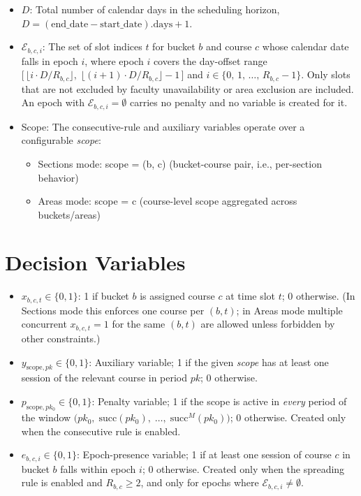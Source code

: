 \documentclass{article}
\begin{document}
\begin{itemize}
    \item $D$: Total number of calendar days in the scheduling horizon, $D = (\text{end\_date} - \text{start\_date}).\text{days} + 1$.
    \item $\mathcal{E}_{b,c,i}$: The set of slot indices $t$ for bucket $b$ and course $c$ whose calendar date falls in epoch $i$, where epoch $i$ covers the day-offset range $\bigl[\,\lfloor i \cdot D / R_{b,c} \rfloor,\; \lfloor (i+1) \cdot D / R_{b,c} \rfloor - 1\,\bigr]$ and $i \in \{0,\, 1,\, \ldots,\, R_{b,c} - 1\}$. Only slots that are not excluded by faculty unavailability or area exclusion are included. An epoch with $\mathcal{E}_{b,c,i} = \emptyset$ carries no penalty and no variable is created for it.
    \item Scope: The consecutive-rule and auxiliary variables operate over a configurable \emph{scope}:
    \begin{itemize}
        \item Sections mode: scope = (b, c) (bucket-course pair, i.e., per-section behavior)
        \item Areas mode: scope = c (course-level scope aggregated across buckets/areas)
    \end{itemize}
\end{itemize}

\section{Decision Variables}
\begin{itemize}
    \item $x_{b,c,t} \in \{0,1\}$: 1 if bucket $b$ is assigned course $c$ at time slot $t$; 0 otherwise. (In Sections mode this enforces one course per $(b,t)$; in Areas mode multiple concurrent $x_{b,c,t}=1$ for the same $(b,t)$ are allowed unless forbidden by other constraints.)
    \item $y_{\mathrm{scope},pk} \in \{0,1\}$: Auxiliary variable; 1 if the given \emph{scope} has at least one session of the relevant course in period $pk$; 0 otherwise.
    \item $p_{\mathrm{scope},pk_0} \in \{0,1\}$: Penalty variable; 1 if the scope is active in \emph{every} period of the window $\bigl(pk_0,\;\mathrm{succ}(pk_0),\;\ldots,\;\mathrm{succ}^M(pk_0)\bigr)$; 0 otherwise. Created only when the consecutive rule is enabled.
    \item $e_{b,c,i} \in \{0,1\}$: Epoch-presence variable; 1 if at least one session of course $c$ in bucket $b$ falls within epoch $i$; 0 otherwise. Created only when the spreading rule is enabled and $R_{b,c} \geq 2$, and only for epochs where $\mathcal{E}_{b,c,i} \neq \emptyset$.
\end{itemize}
\end{document}
